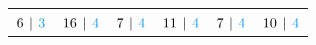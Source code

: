 \newcommand{\goctagon}{
\begin{tikzpicture}
\Vertex[x=0.00, y=0.70]{0}
\Vertex[x=0.49, y=0.49]{1}
\Vertex[x=0.70, y=0.00]{2}
\Vertex[x=0.49, y=-0.49]{3}
\Vertex[x=0.00, y=-0.70]{4}
\Vertex[x=-0.49, y=-0.49]{5}
\Vertex[x=-0.70, y=-0.00]{6}
\Vertex[x=-0.49, y=0.49]{7}

\Edge(0)(1)
\Edge(1)(2)
\Edge(2)(3)
\Edge(3)(4)
\Edge(4)(5)
\Edge(5)(6)
\Edge(6)(7)
\Edge(7)(0)

\end{tikzpicture}
}



\newcommand{\cyclesubgraphs}{
\begin{tabular}{c c c c c c}
    \gtriangle & \gsquare & \gpentagon & \ghexagon & \gseptagon & \goctagon \\
     $8$ & $17$ & $7$ & $12$ & $7$ & $10$ 
\end{tabular}
}


\newcommand{\cyclesubgraphslcc}{
\begin{tabular}{c c c c c c}
    \gtriangle & \gsquare & \gpentagon & \ghexagon & \gseptagon & \goctagon \\
     $6 \hspace{4pt} | \hspace{4pt} \textcolor{TwitterBlue}{3}$ & $16 \hspace{4pt} | \hspace{4pt} \textcolor{TwitterBlue}{4}$ & $7 \hspace{4pt} | \hspace{4pt} \textcolor{TwitterBlue}{4}$ & $11 \hspace{4pt} | \hspace{4pt} \textcolor{TwitterBlue}{4}$ & $7 \hspace{4pt} | \hspace{4pt} \textcolor{TwitterBlue}{4}$ & $10 \hspace{4pt} | \hspace{4pt} \textcolor{TwitterBlue}{4}$ 
\end{tabular}
}


\cyclesubgraphslcc
